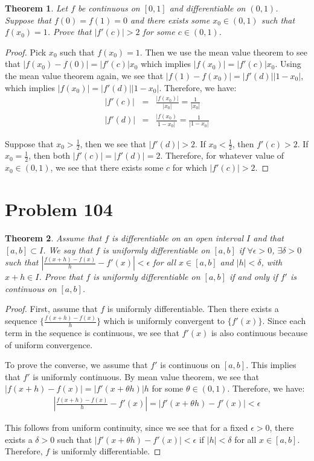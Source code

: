 \documentclass[psamsfonts]{amsart}
\newtheorem{thm}{Theorem}[section]
\theoremstyle{definition}
\theoremstyle{remark}
\numberwithin{equation}{section}
\begin{document}
\begin{thm}
Let $f$ be continuous on $[0,1]$ and differentiable on $(0,1)$. Suppose that $f(0) = f(1) = 0$ and there exists some $x_0 \in (0,1)$ such that $f(x_0) = 1$. Prove that $|f'(c) | > 2 $ for some $c \in (0,1)$. 
\end{thm}

\begin{proof}
Pick $x_0$ such that $f(x_0) = 1$. Then we use the mean value theorem to see that $|f(x_0) - f(0)| = |f'(c)| x_0$ which implies $|f(x_0)| = |f'(c)| x_0$. Using the mean value theorem again, we see that $|f(1) - f(x_0)| = |f'(d)| |1 - x_0 |$, which implies $|f(x_0)| = |f'(d)| | 1 - x_0| $. Therefore, we have:
\begin{eqnarray}
|f'(c)| &=& \frac{|f(x_0)|}{|x_0|} = \frac{1}{|x_0|} \\
|f'(d)| &=& \frac{|f(x_0)}{1 - x_0|} = \frac{1}{|1 - x_0|} 
\end{eqnarray}

Suppose that $x_0 > \frac{1}{2}$, then we see that $|f'(d)| > 2$. If $x_0 < \frac{1}{2}$, then $f'(c) > 2$. If $x_0 = \frac{1}{2}$, then both $|f'(c)| = |f'(d)| = 2$. Therefore, for whatever value of $x_0 \in (0,1)$, we see that there exists some $c$ for which $|f'(c)| > 2$. 
\end{proof}

\section{Problem 104}

\begin{thm}
Assume that $f$ is differentiable on an open interval $I$ and that $[a,b] \subset I$. We say that $f$ is uniformly differentiable on $[a,b]$ if $\forall \epsilon > 0$, $\exists \delta > 0$ such that $| \frac{f(x+h) - f(x)}{h} - f'(x)| < \epsilon$ for all $x \in [a,b]$ and $|h| < \delta$, with $x+h \in I$. Prove that $f$ is uniformly differentiable on $[a,b]$ if and only if $f'$ is continuous on $[a,b]$.
\end{thm}

\begin{proof}
First, assume that $f$ is uniformly differentiable. Then there exists a sequence $\{ \frac{f(x+h) - f(x)}{h} \}$ which is uniformly convergent to $\{ f'(x) \}$. Since each term in the sequence is continuous, we see that $f'(x)$ is also continuous because of uniform convergence. 

To prove the converse, we assume that $f'$ is continuous on $[a,b]$. This implies that $f'$ is uniformly continuous. By mean value theorem, we see that $|f(x+h) - f(x)| = |f'(x + \theta h)| h$ for some $\theta \in (0,1)$. Therefore, we have:
\begin{eqnarray}
\left| \frac{f(x+h) - f(x)}{h} - f'(x) \right|= |f'(x+ \theta h) - f'(x)| < \epsilon
\end{eqnarray}

This follows from uniform continuity, since we see that for a fixed $\epsilon > 0$, there exists a $\delta > 0$ such that $|f'(x+ \theta h) - f'(x)| < \epsilon$ if $|h| < \delta$ for all $x \in [a,b]$. Therefore, $f$ is uniformly differentiable.
\end{proof}
\end{document}
